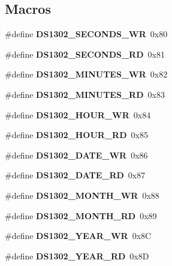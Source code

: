 \subsection*{Macros}
\begin{DoxyCompactItemize}
\item 
\mbox{\label{_s_d___r_t_c__functions_8h_ac0bf5d4ed56463032c8735fdfd200da0}} 
\#define {\bfseries D\+S1302\+\_\+\+S\+E\+C\+O\+N\+D\+S\+\_\+\+WR}~0x80
\item 
\mbox{\label{_s_d___r_t_c__functions_8h_a83a504aca68d28a23ceb03b38384a509}} 
\#define {\bfseries D\+S1302\+\_\+\+S\+E\+C\+O\+N\+D\+S\+\_\+\+RD}~0x81
\item 
\mbox{\label{_s_d___r_t_c__functions_8h_a6afbe79491082889b12adc4d0f5edf2f}} 
\#define {\bfseries D\+S1302\+\_\+\+M\+I\+N\+U\+T\+E\+S\+\_\+\+WR}~0x82
\item 
\mbox{\label{_s_d___r_t_c__functions_8h_aef49f9b406cc8cbf23066e20382a17b9}} 
\#define {\bfseries D\+S1302\+\_\+\+M\+I\+N\+U\+T\+E\+S\+\_\+\+RD}~0x83
\item 
\mbox{\label{_s_d___r_t_c__functions_8h_a66cba43eaecb1e047f73265c11fe2aac}} 
\#define {\bfseries D\+S1302\+\_\+\+H\+O\+U\+R\+\_\+\+WR}~0x84
\item 
\mbox{\label{_s_d___r_t_c__functions_8h_a66a5375fea0bd8f39ccce55262571c87}} 
\#define {\bfseries D\+S1302\+\_\+\+H\+O\+U\+R\+\_\+\+RD}~0x85
\item 
\mbox{\label{_s_d___r_t_c__functions_8h_ab53e4481fe7704a79f469d7ae81d7ba8}} 
\#define {\bfseries D\+S1302\+\_\+\+D\+A\+T\+E\+\_\+\+WR}~0x86
\item 
\mbox{\label{_s_d___r_t_c__functions_8h_aa1076dbea29ed93a566866146adf87d3}} 
\#define {\bfseries D\+S1302\+\_\+\+D\+A\+T\+E\+\_\+\+RD}~0x87
\item 
\mbox{\label{_s_d___r_t_c__functions_8h_a5f4f20e5d9f7c19a35bee8823a2eecf8}} 
\#define {\bfseries D\+S1302\+\_\+\+M\+O\+N\+T\+H\+\_\+\+WR}~0x88
\item 
\mbox{\label{_s_d___r_t_c__functions_8h_acd933e6f2acf25bfae4c60b88c99292f}} 
\#define {\bfseries D\+S1302\+\_\+\+M\+O\+N\+T\+H\+\_\+\+RD}~0x89
\item 
\mbox{\label{_s_d___r_t_c__functions_8h_ab516547df86ac771c599ad840d806b69}} 
\#define {\bfseries D\+S1302\+\_\+\+Y\+E\+A\+R\+\_\+\+WR}~0x8C
\item 
\mbox{\label{_s_d___r_t_c__functions_8h_a37e2286ca2d3b25fa17400b5cdba8e43}} 
\#define {\bfseries D\+S1302\+\_\+\+Y\+E\+A\+R\+\_\+\+RD}~0x8D
\end{DoxyCompactItemize}
